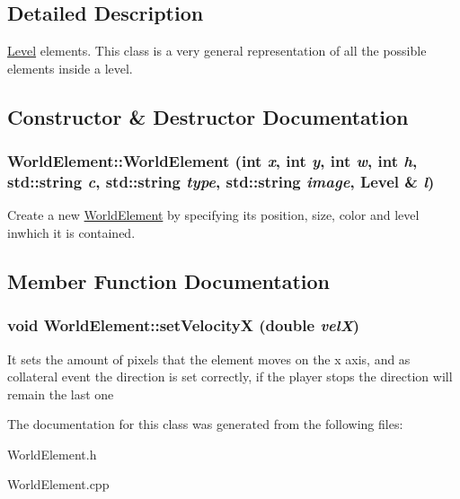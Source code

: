 \subsection{Detailed Description}
\hyperlink{classLevel}{Level} elements. This class is a very general representation of all the possible elements inside a level. 

\subsection{Constructor \& Destructor Documentation}
\hypertarget{classWorldElement_a33af28b392e681b405a502f9cc143bcd}{
\subsubsection[{WorldElement}]{\setlength{\rightskip}{0pt plus 5cm}WorldElement::WorldElement (int {\em x}, \/  int {\em y}, \/  int {\em w}, \/  int {\em h}, \/  std::string {\em c}, \/  std::string {\em type}, \/  std::string {\em image}, \/  {\bf Level} \& {\em l})}}
\label{classWorldElement_a33af28b392e681b405a502f9cc143bcd}
Create a new \hyperlink{classWorldElement}{WorldElement} by specifying its position, size, color and level inwhich it is contained. 

\subsection{Member Function Documentation}
\hypertarget{classWorldElement_a64f052dba6615d61bb277365a0e5c409}{
\subsubsection[{setVelocityX}]{\setlength{\rightskip}{0pt plus 5cm}void WorldElement::setVelocityX (double {\em velX})}}
\label{classWorldElement_a64f052dba6615d61bb277365a0e5c409}
It sets the amount of pixels that the element moves on the x axis, and as collateral event the direction is set correctly, if the player stops the direction will remain the last one 

The documentation for this class was generated from the following files:\begin{DoxyCompactItemize}
\item 
WorldElement.h\item 
WorldElement.cpp\end{DoxyCompactItemize}
